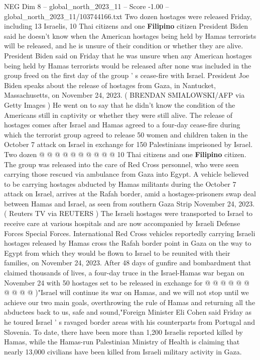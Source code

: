 \begin{textsample}{NEG Dim 8 – global\_north\_2023\_11 – Score -1.00 – global\_north\_2023\_11/103744166.txt}  \label{ex:f8_neg_259}
Two dozen hostages were released Friday, including 13 Israelis, 10 Thai citizens and one \textbf{Filipino} citizen President Biden said he doesn't know when the American hostages being held by Hamas terrorists will be released, and he is unsure of their condition or whether they are alive.
President Biden said on Friday that he was unsure when any American hostages being held by Hamas terrorists would be released after none was included in the group freed on the first day of the group ' s cease-fire with Israel.
President Joe Biden speaks about the release of hostages from Gaza, in Nantucket, Massachusetts, on November 24, 2023. ( BRENDAN SMIALOWSKI/AFP via Getty Images ) He went on to say that he didn't know the condition of the Americans still in captivity or whether they were still alive.
The release of hostages comes after Israel and Hamas agreed to a four-day cease-fire during which the terrorist group agreed to release 50 women and children taken in the October 7 attack on Israel in exchange for 150 Palestinians imprisoned by Israel.
Two dozen @ @ @ @ @ @ @ @ @ @ 10 Thai citizens and one \textbf{Filipino} citizen.
The group was released into the care of Red Cross personnel, who were seen carrying those rescued via ambulance from Gaza into Egypt.
A vehicle believed to be carrying hostages abducted by Hamas militants during the October 7 attack on Israel, arrives at the Rafah border, amid a hostages-prisoners swap deal between Hamas and Israel, as seen from southern Gaza Strip November 24, 2023. ( Reuters TV via REUTERS ) The Israeli hostages were transported to Israel to receive care at various hospitals and are now accompanied by Israeli Defense Forces Special Forces.
International Red Cross vehicles reportedly carrying Israeli hostages released by Hamas cross the Rafah border point in Gaza on the way to Egypt from which they would be flown to Israel to be reunited with their families, on November 24, 2023.
After 48 days of gunfire and bombardment that claimed thousands of lives, a four-day truce in the Israel-Hamas war began on November 24 with 50 hostages set to be released in exchange for @ @ @ @ @ @ @ @ @ @ )"Israel will continue its war on Hamas, and we will not stop until we achieve our two main goals, overthrowing the rule of Hamas and returning all the abductees back to us, safe and sound,"Foreign Minister Eli Cohen said Friday as he toured Israel ' s ravaged border areas with his counterparts from Portugal and Slovenia.
To date, there have been more than 1,200 Israelis reported killed by Hamas, while the Hamas-run Palestinian Ministry of Health is claiming that nearly 13,000 civilians have been killed from Israeli military activity in Gaza.

\end{textsample}
